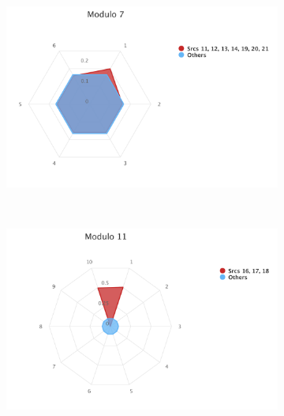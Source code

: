 \begin{figure}[ht]
\centering
\begin{subfigure}{0.9\textwidth}
	\includegraphics[width=\linewidth]{tex/images/analysis/mod7}
\end{subfigure}\\

\begin{subfigure}{0.9\textwidth}
	\includegraphics[width=\linewidth]{tex/images/analysis/mod11}
\end{subfigure}
\end{figure}

